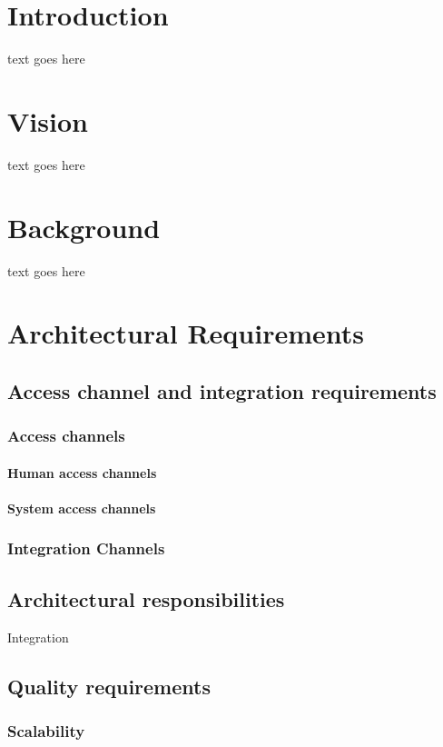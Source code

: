 \documentclass[10pt]{article}
\begin{document}

\newpage
\tableofcontents
\newpage
\listoffigures
\newpage

\section{Introduction}
text goes here

\section{Vision}
text goes here

\section{Background}
text goes here

\section{Architectural Requirements}
\subsection{Access channel and integration requirements} 
\subsubsection{Access channels}
\paragraph{Human access channels}
\paragraph{System access channels}
\subsubsection{Integration Channels}
\clearpage

\subsection{Architectural responsibilities}  %
Integration
\clearpage
\subsection{Quality requirements} %
\subsubsection{Scalability}
\end{document}
